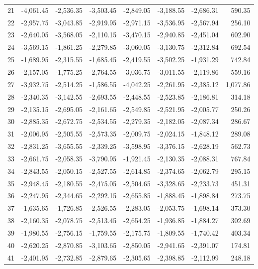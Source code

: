 \begin{longtable}{rrrrrrrr}
21 & -4,061.45 & -2,536.35 & -3,503.45 & -2,849.05 & -3,188.55 & -2,686.31 & 590.35  \\
22 & -2,957.75 & -3,043.85 & -2,919.95 & -2,971.15 & -3,536.95 & -2,567.94 & 256.10  \\
23 & -2,640.05 & -3,568.05 & -2,110.15 & -3,470.15 & -2,940.85 & -2,451.04 & 602.90  \\
24 & -3,569.15 & -1,861.25 & -2,279.85 & -3,060.05 & -3,130.75 & -2,312.84 & 692.54  \\
25 & -1,689.95 & -2,315.55 & -1,685.45 & -2,419.55 & -3,502.25 & -1,931.29 & 742.84  \\
26 & -2,157.05 & -1,775.25 & -2,764.55 & -3,036.75 & -3,011.55 & -2,119.86 & 559.16  \\
27 & -3,932.75 & -2,514.25 & -1,586.55 & -4,042.25 & -2,261.95 & -2,385.12 & 1,077.86  \\
28 & -2,340.35 & -3,142.55 & -2,693.55 & -2,448.55 & -2,523.85 & -2,186.81 & 314.18  \\
29 & -2,135.15 & -2,695.05 & -2,161.65 & -2,549.85 & -2,521.95 & -2,005.77 & 250.26  \\
30 & -2,885.35 & -2,672.75 & -2,534.55 & -2,279.35 & -2,182.05 & -2,087.34 & 286.67  \\
31 & -2,006.95 & -2,505.55 & -2,573.35 & -2,009.75 & -2,024.15 & -1,848.12 & 289.08  \\
32 & -2,831.25 & -3,655.55 & -2,339.25 & -3,598.95 & -3,376.15 & -2,628.19 & 562.73  \\
33 & -2,661.75 & -2,058.35 & -3,790.95 & -1,921.45 & -2,130.35 & -2,088.31 & 767.84  \\
34 & -2,843.55 & -2,050.15 & -2,527.55 & -2,614.85 & -2,374.65 & -2,062.79 & 295.15  \\
35 & -2,948.45 & -2,180.55 & -2,475.05 & -2,504.65 & -3,328.65 & -2,233.73 & 451.31  \\
36 & -2,247.95 & -2,344.65 & -2,292.15 & -2,655.85 & -1,888.45 & -1,898.84 & 273.75  \\
37 & -1,635.65 & -1,726.85 & -2,526.55 & -2,283.05 & -2,053.75 & -1,698.14 & 373.30  \\
38 & -2,160.35 & -2,078.75 & -2,513.45 & -2,654.25 & -1,936.85 & -1,884.27 & 302.69  \\
39 & -1,980.55 & -2,756.15 & -1,759.55 & -2,175.75 & -1,809.55 & -1,740.42 & 403.34  \\
40 & -2,620.25 & -2,870.85 & -3,103.65 & -2,850.05 & -2,941.65 & -2,391.07 & 174.81  \\
41 & -2,401.95 & -2,732.85 & -2,879.65 & -2,305.65 & -2,398.85 & -2,112.99 & 248.18  \\

\end{longtable}
